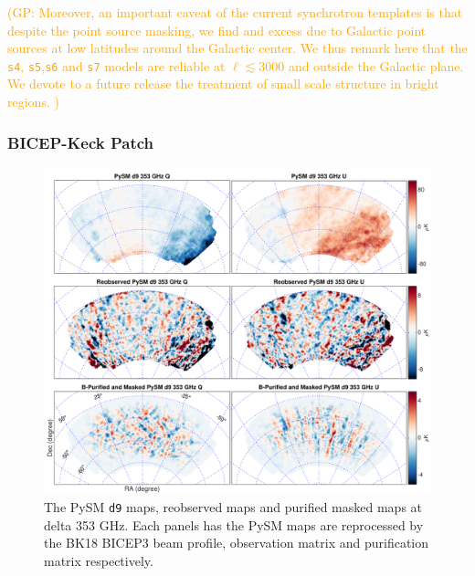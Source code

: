 \documentclass[twocolumn]{aastex631}
\newcommand{\giuse}[1]{\textcolor{orange}{(GP: #1)}}
\begin{document}
\giuse{Moreover, an important caveat of the current synchrotron templates is that despite the point source masking, we find and excess due to Galactic point sources at low   latitudes around the Galactic center. We thus remark here that the \texttt{s4}, \texttt{s5},\texttt{s6} and \texttt{s7} models  are reliable at $\ell \lesssim 3000 $ and outside the Galactic plane. We devote to a future release the treatment of small scale structure in bright regions. }


\subsubsection{BICEP-Keck Patch}

\begin{figure}
    \centering
    \includegraphics[width=2.\columnwidth]{figures/pysm_d9_353_delta_reobs_B_pub.pdf}
    \caption{The PySM \texttt{d9} maps, reobserved maps and purified masked maps at delta 353 GHz. Each panels has the
    PySM maps are reprocessed by the BK18 BICEP3 beam profile, observation matrix and purification matrix respectively.}
    \label{fig:psym_BKmatrix}
\end{figure}
\end{document}
